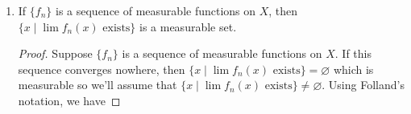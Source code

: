 \documentclass[11pt,oneside,english]{amsart}
\theoremstyle{definition}
\newcommand{\R}{\mathbb{R}}
\begin{document}
\begin{enumerate}
\begin{enumerate}
\begin{proof}
First, observe that

\begin{align*}
h^{-1}(\{a\})&=\{x\mid f(x)=-g(x)=\pm\infty\}\\[2mm]
&=\left(\{x\mid f(x)=+\infty\}\cap\{x\mid g(x)=-\infty\}\right)\cup(\{x \mid f(x)=-\infty\}\cap \{x\mid g(x)=+\infty\})\\[2mm]
&=\left(f^{-1}(\{+\infty\})\cap g^{-1}(\{-\infty\})\right)\cup\left(f^{-1}(\{-\infty\})\cap g^{-1}(\{+\infty\})\right)
\end{align*}


By exercise 2.1.1, these are all measurable sets since $f$ and $g$ are measurable. Now, let $b\in\overline{\R}$. Then 

\begin{align*}
h^{-1}((b,\infty])&=\begin{cases}(f+g)^{-1}((b,\infty]) & \text{if }b>a\\ (f+g)^{-1}((b,a))\cup h^{-1}(\{a\})\cup(f+g)^{-1}((a,\infty]) & \text{if }b\leq a\end{cases}\\[2mm]
&=\begin{cases}(f+g)^{-1}((b,\infty))\cup(f+g)^{-1}(\{\infty\}) & \text{if }b>a\\ (f+g)^{-1}((b,a))\cup h^{-1}(\{a\})\cup(f+g)^{-1}((a,\infty))\cup(f+g)^{-1}(\{\infty\}) & \text{if }b\leq a\end{cases}\\[2mm]
\end{align*}

Since $f$ and $g$ are measurable, so is their sum, and this combined with exercise 2.1.1 yields that $h^{-1}((b,\infty])$ is measurable, and so $h$ is measurable by definition.
\end{proof}


\end{enumerate}

\pagebreak

\item If $\{f_n\}$ is a sequence of measurable functions on $X$, then $\{x\mid \lim f_n(x)\text{ exists}\}$ is a measurable set.

\begin{proof}

Suppose $\{f_n\}$ is a sequence of measurable functions on $X$. If this sequence converges nowhere, then $\{x\mid \lim f_n(x)\text{ exists}\}=\varnothing$ which is measurable so we'll assume that $\{x\mid \lim f_n(x)\text{ exists}\}\neq\varnothing$. Using Folland's notation, we have


\end{proof}
\end{enumerate}
\end{document}
